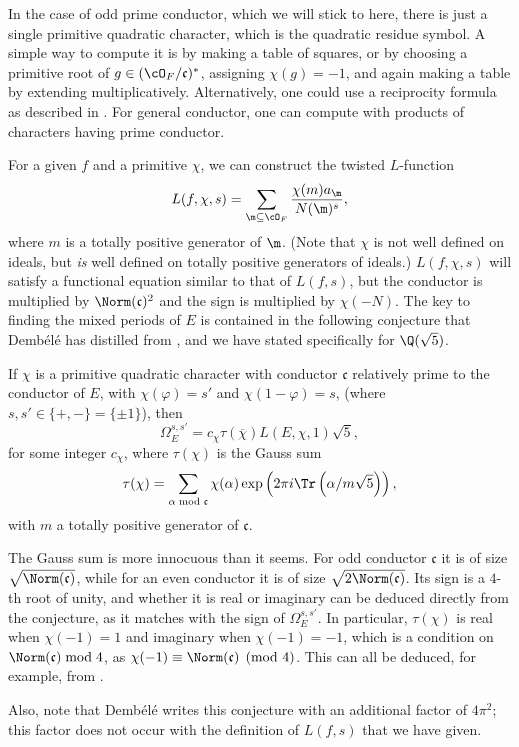 \documentclass{amsart}
\newcommand{\fc}{\mathfrak{c}}
\newcommand{\OF}{\cO_F}
\newcommand{\dembele}{Demb\'el{\'e}\xspace}
\begin{document}
In the case of odd prime conductor, which we will stick to here, there is
just a single primitive quadratic character, which is the quadratic residue symbol.
A simple way to compute it is by making a
table of squares, or by choosing a primitive root of $g \in (\OF/\fc)^*$, assigning
$\chi(g) = -1$, and again making a table by extending multiplicatively. Alternatively,
one could use a reciprocity formula as described in \cite{boylan-skoruppa:hecke-gauss-sums}.
For general conductor, one can compute with products of characters having prime conductor.

For a given $f$ and a primitive $\chi$, we can construct the twisted $L$-function
\[
    L(f, \chi, s) = \sum_{\m \subseteq \OF} \frac{\chi(m)a{_{\m}}}{N(\m)^s},
\]
where $m$ is a totally positive generator of $\m$. (Note that $\chi$ is not well defined
on ideals, but {\em is} well defined on totally positive generators of ideals.) $L(f, \chi, s)$
will satisfy a functional equation similar to that of $L(f, s)$, but the conductor is
multiplied by $\Norm(\fc)^2$ and the sign is multiplied by $\chi(-N)$. The key to finding the
mixed periods of $E$ is contained in the following conjecture that \dembele has distilled
from \cite{bertolini-darmon-green}, and we have stated specifically for $\Q(\sqrt5)$.
\begin{conjecture}
If $\chi$ is a primitive quadratic character with conductor $\fc$ relatively prime to the
conductor of $E$, with $\chi(\varphi) = s'$ and
$\chi(1 - \varphi) = s$, (where $s, s' \in \{+, -\} = \{\pm1\}$), then
\[
    \Omega^{s,s'}_E = c_\chi \tau(\overline\chi) L(E, \chi, 1)\sqrt5,
\]
for some integer $c_\chi$, where $\tau(\chi)$ is the Gauss sum
\[
    \tau(\chi) = \sum_{\alpha \bmod \fc} \chi(\alpha) \exp\left(2 \pi i \Tr\left(\alpha/m\sqrt{5}\right) \right),
\]
with $m$ a totally positive generator of $\fc$.
\end{conjecture}
\begin{remark}
  The Gauss sum is more innocuous than it
  seems. For odd conductor $\fc$ it is of size $\sqrt{\Norm(\fc)}$, while
  for an even conductor it is of size $\sqrt{2 \Norm(\fc) }$.  Its sign is
  a $4$-th root of unity, and whether it is real or imaginary can be
  deduced directly from the conjecture, as it matches with the sign of
  $\Omega^{s,s'}_E$. In particular, $\tau(\chi)$ is real when
  $\chi(-1) = 1$ and imaginary when $\chi(-1) = -1$, which is a
  condition on $\Norm(\fc) \bmod 4$, as $\chi(-1) \equiv \Norm(\fc) \pmod
  4$. This can all be deduced, for example, from
  \cite{boylan-skoruppa:hecke-gauss-sums}.

Also, note that \dembele writes this conjecture with an additional factor of $4\pi^2$;
this factor does not occur with the definition of $L(f, s)$ that we have given.

\end{remark}
\end{document}
